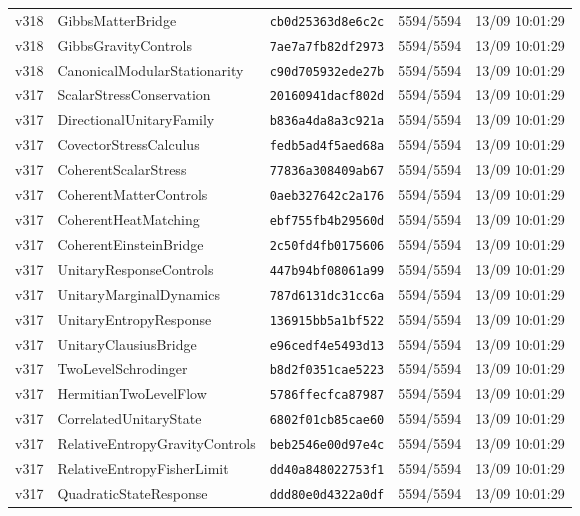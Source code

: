 \documentclass[11pt]{article}
\theoremstyle{definition}\newtheorem{deriv}{Derivação}
\begin{document}
{\begin{longtable}{@{}lllll@{}}
v318 & GibbsMatterBridge & \texttt{cb0d25363d8e6c2c} & 5594/5594 & 13/09 10:01:29 \\
v318 & GibbsGravityControls & \texttt{7ae7a7fb82df2973} & 5594/5594 & 13/09 10:01:29 \\
v318 & CanonicalModularStationarity & \texttt{c90d705932ede27b} & 5594/5594 & 13/09 10:01:29 \\
v317 & ScalarStressConservation & \texttt{20160941dacf802d} & 5594/5594 & 13/09 10:01:29 \\
v317 & DirectionalUnitaryFamily & \texttt{b836a4da8a3c921a} & 5594/5594 & 13/09 10:01:29 \\
v317 & CovectorStressCalculus & \texttt{fedb5ad4f5aed68a} & 5594/5594 & 13/09 10:01:29 \\
v317 & CoherentScalarStress & \texttt{77836a308409ab67} & 5594/5594 & 13/09 10:01:29 \\
v317 & CoherentMatterControls & \texttt{0aeb327642c2a176} & 5594/5594 & 13/09 10:01:29 \\
v317 & CoherentHeatMatching & \texttt{ebf755fb4b29560d} & 5594/5594 & 13/09 10:01:29 \\
v317 & CoherentEinsteinBridge & \texttt{2c50fd4fb0175606} & 5594/5594 & 13/09 10:01:29 \\
v317 & UnitaryResponseControls & \texttt{447b94bf08061a99} & 5594/5594 & 13/09 10:01:29 \\
v317 & UnitaryMarginalDynamics & \texttt{787d6131dc31cc6a} & 5594/5594 & 13/09 10:01:29 \\
v317 & UnitaryEntropyResponse & \texttt{136915bb5a1bf522} & 5594/5594 & 13/09 10:01:29 \\
v317 & UnitaryClausiusBridge & \texttt{e96cedf4e5493d13} & 5594/5594 & 13/09 10:01:29 \\
v317 & TwoLevelSchrodinger & \texttt{b8d2f0351cae5223} & 5594/5594 & 13/09 10:01:29 \\
v317 & HermitianTwoLevelFlow & \texttt{5786ffecfca87987} & 5594/5594 & 13/09 10:01:29 \\
v317 & CorrelatedUnitaryState & \texttt{6802f01cb85cae60} & 5594/5594 & 13/09 10:01:29 \\
v317 & RelativeEntropyGravityControls & \texttt{beb2546e00d97e4c} & 5594/5594 & 13/09 10:01:29 \\
v317 & RelativeEntropyFisherLimit & \texttt{dd40a848022753f1} & 5594/5594 & 13/09 10:01:29 \\
v317 & QuadraticStateResponse & \texttt{ddd80e0d4322a0df} & 5594/5594 & 13/09 10:01:29 \\

\end{longtable}}
\end{document}
